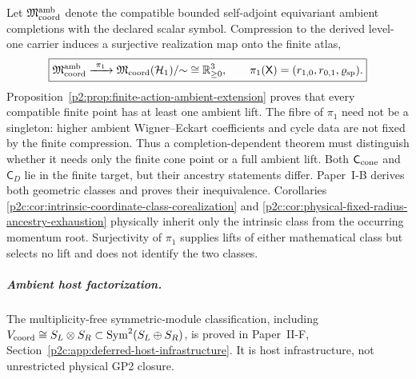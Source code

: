\documentclass[12pt,a4paper]{article}
\begin{document}
\begin{remark}
\label{p2c:rem:two-stage-coordinate-realization-family}
Let \(\mathfrak M_{\rm coord}^{\rm amb}\) denote the compatible bounded
self-adjoint equivariant ambient completions with the declared scalar symbol.
Compression to the derived level-one carrier induces a surjective realization
map onto the finite atlas,
\[
 \boxed{
 \mathfrak M_{\rm coord}^{\rm amb}
 \xrightarrow{\ \pi_1\ }
 \mathfrak M_{\rm coord}(\mathcal H_1)/{\sim}
 \cong\mathbb R_{\ge0}^{3},
 \qquad
 \pi_1(\mathsf X)=(r_{1,0},r_{0,1},\varrho_{\rm sp}).}
\]
Proposition~\ref{p2:prop:finite-action-ambient-extension} proves that every
compatible finite point has at least one ambient lift.  The fibre of
\(\pi_1\) need not be a singleton: higher ambient Wigner--Eckart coefficients
and cycle data are not fixed by the finite compression.  Thus a
completion-dependent theorem must distinguish whether it needs only the
finite cone point or a full ambient lift.
Both \(\mathsf C_{\rm cone}\) and \(\mathsf C_D\) lie in the finite target,
but their ancestry statements differ.  Paper~I-B derives both geometric
classes and proves their inequivalence.  Corollaries~
\ref{p2c:cor:intrinsic-coordinate-class-corealization} and
\ref{p2c:cor:physical-fixed-radius-ancestry-exhaustion} physically inherit
only the intrinsic class from the occurring momentum root.  Surjectivity of
\(\pi_1\) supplies lifts of either mathematical class but selects no lift and
does not identify the two classes.
\end{remark}

\subparagraph{Ambient host factorization.}
The multiplicity-free symmetric-module classification, including
\(V_{\rm coord}\cong S_L\otimes S_R\subset\operatorname{Sym}^2(S_L\oplus S_R)\),
is proved in Paper~II-F, Section~\ref{p2c:app:deferred-host-infrastructure}.  It is host
infrastructure, not unrestricted physical GP2 closure.
\end{document}
